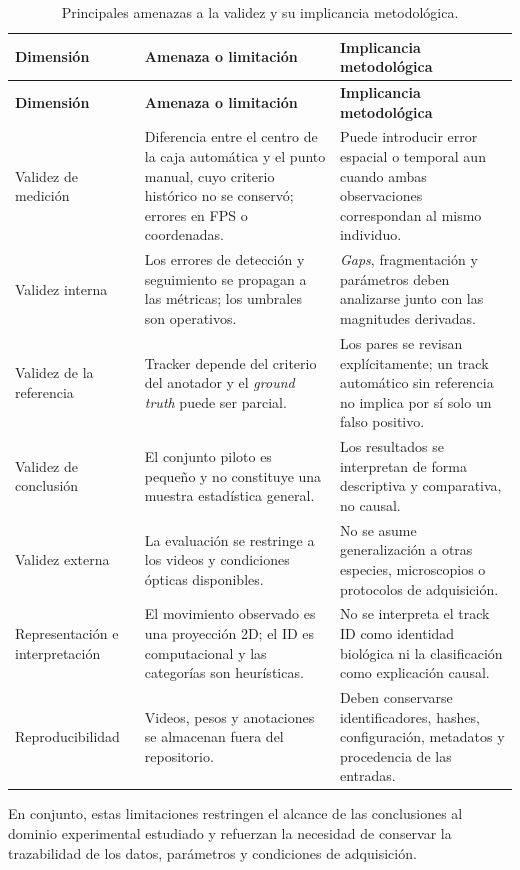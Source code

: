 \begin{longtable}{@{}>{\raggedright\arraybackslash}p{}>{\raggedright\arraybackslash}p{}>{\raggedright\arraybackslash}p{}@{}}
\caption{Principales amenazas a la validez y su implicancia metodológica.}
\label{tab:amenazas-validez}\\
\toprule
\textbf{Dimensión} & \textbf{Amenaza o limitación} & \textbf{Implicancia metodológica} \\
\midrule
\endfirsthead
\toprule
\textbf{Dimensión} & \textbf{Amenaza o limitación} & \textbf{Implicancia metodológica} \\
\midrule
\endhead
\bottomrule
\endfoot

Validez de medición &
Diferencia entre el centro de la caja automática y el punto manual, cuyo criterio histórico no se conservó; errores en FPS o coordenadas. &
Puede introducir error espacial o temporal aun cuando ambas observaciones correspondan al mismo individuo. \\

Validez interna &
Los errores de detección y seguimiento se propagan a las métricas; los umbrales son operativos. &
\textit{Gaps}, fragmentación y parámetros deben analizarse junto con las magnitudes derivadas. \\

Validez de la referencia &
Tracker depende del criterio del anotador y el \textit{ground truth} puede ser parcial. &
Los pares se revisan explícitamente; un track automático sin referencia no implica por sí solo un falso positivo. \\

Validez de conclusión &
El conjunto piloto es pequeño y no constituye una muestra estadística general. &
Los resultados se interpretan de forma descriptiva y comparativa, no causal. \\

Validez externa &
La evaluación se restringe a los videos y condiciones ópticas disponibles. &
No se asume generalización a otras especies, microscopios o protocolos de adquisición. \\

Representación e interpretación &
El movimiento observado es una proyección 2D; el ID es computacional y las categorías son heurísticas. &
No se interpreta el track ID como identidad biológica ni la clasificación como explicación causal. \\

Reproducibilidad &
Videos, pesos y anotaciones se almacenan fuera del repositorio. &
Deben conservarse identificadores, hashes, configuración, metadatos y procedencia de las entradas. \\

\end{longtable}
\endgroup

En conjunto, estas limitaciones restringen el alcance de las conclusiones al dominio experimental estudiado y refuerzan la necesidad de conservar la trazabilidad de los datos, parámetros y condiciones de adquisición.

